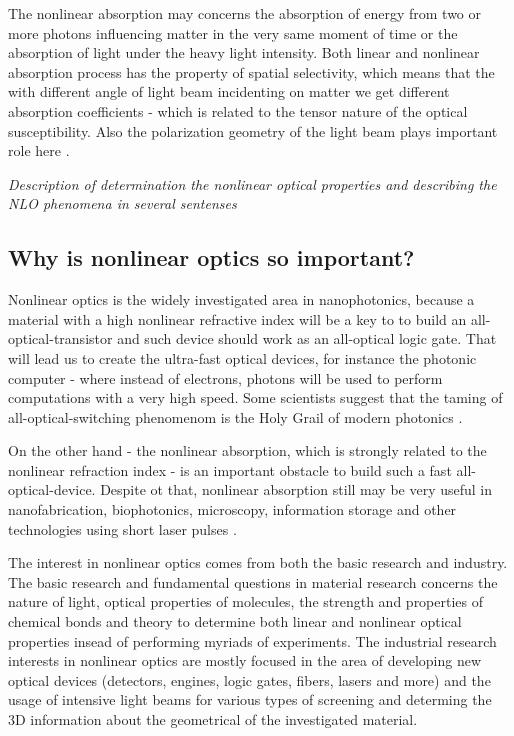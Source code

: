 \documentclass[12pt,twoside,a4paper]{article}
\numberwithin{equation}{subsection}
\numberwithin{figure}{subsection}
\begin{document}
The nonlinear absorption may concerns the absorption of energy from two or more photons influencing matter in the very 
same moment of time or the absorption of light under the heavy light intensity. Both linear and nonlinear absorption 
process has the property of spatial selectivity, which means that the with different angle of light beam incidenting on 
matter we get different absorption coefficients - which is related to the tensor nature of the optical susceptibility. 
Also the polarization geometry of the light beam plays important role here \cite{boyd_chirality}.

\textit{Description of determination the nonlinear optical properties and describing the NLO phenomena in several sentenses}

\subsection{Why is nonlinear optics so important?} \label{chap:introducion_rank}

Nonlinear optics is the widely investigated area in nanophotonics, because a material with a high nonlinear refractive 
index will be a key to to build an all-optical-transistor and such device should work as an all-optical logic gate. 
That will lead us to create the ultra-fast optical devices, for instance the photonic computer - where instead of electrons, 
photons will be used to perform computations with a very high speed. Some scientists suggest that the taming of 
all-optical-switching phenomenom is the Holy Grail of modern photonics \cite{samoc_nlo_opt_mat}.

On the other hand - the nonlinear absorption, which is strongly related to the nonlinear refraction index - is an important obstacle
to build such a fast all-optical-device. Despite ot that, nonlinear absorption still may be very useful in nanofabrication, biophotonics,
microscopy, information storage and other technologies using short laser pulses \cite{samoc_nlo_absorption}. 

The interest in nonlinear optics comes from both the basic research and industry. The basic research and fundamental questions in material
research concerns the nature of light, optical properties of molecules, the strength and properties of chemical bonds and theory to
determine both linear and nonlinear optical properties insead of performing myriads of experiments. The industrial research interests
in nonlinear optics are mostly focused in the area of developing new optical devices (detectors, engines, logic gates, fibers, lasers and
more) and the usage of intensive light beams for various types of screening and determing the 3D information about the geometrical of
the investigated material.
\end{document}

